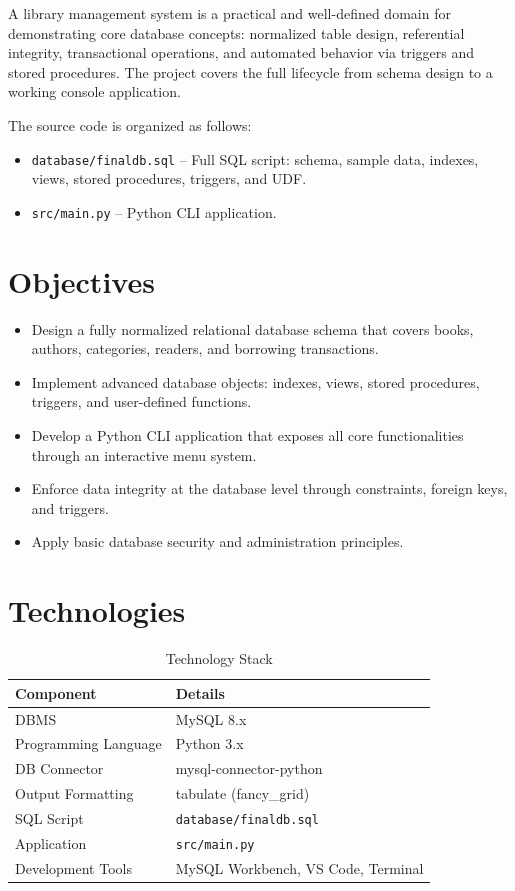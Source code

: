 \documentclass[12pt,a4paper,oneside]{report}
\begin{document}
A library management system is a practical and well-defined domain for demonstrating core
database concepts: normalized table design, referential integrity, transactional operations, and
automated behavior via triggers and stored procedures. The project covers the full lifecycle from
schema design to a working console application.

The source code is organized as follows:
\begin{itemize}
  \item \texttt{database/finaldb.sql} -- Full SQL script: schema, sample data, indexes,
        views, stored procedures, triggers, and UDF.
  \item \texttt{src/main.py} -- Python CLI application.
\end{itemize}

\section{Objectives}

\begin{itemize}
  \item Design a fully normalized relational database schema that covers books, authors,
        categories, readers, and borrowing transactions.
  \item Implement advanced database objects: indexes, views, stored procedures, triggers,
        and user-defined functions.
  \item Develop a Python CLI application that exposes all core functionalities through an
        interactive menu system.
  \item Enforce data integrity at the database level through constraints, foreign keys,
        and triggers.
  \item Apply basic database security and administration principles.
\end{itemize}

\section{Technologies}

\begin{table}[H]
  \centering
  \caption{Technology Stack}
  \begin{tabularx}{\linewidth}{L{4cm} X}
    \toprule
    \textbf{Component} & \textbf{Details} \\
    \midrule
    DBMS                 & MySQL 8.x \\
    Programming Language & Python 3.x \\
    DB Connector         & mysql-connector-python \\
    Output Formatting    & tabulate (fancy\_grid) \\
    SQL Script           & \texttt{database/finaldb.sql} \\
    Application          & \texttt{src/main.py} \\
    Development Tools    & MySQL Workbench, VS Code, Terminal \\
    \bottomrule
  \end{tabularx}
\end{table}
\end{document}

